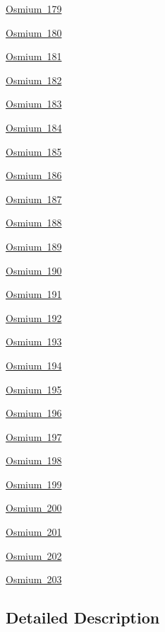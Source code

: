 \begin{DoxyCompactItemize}
\item 
\mbox{\hyperlink{group___isotope_const-_osmium-_os179}{Osmium 179}}
\item 
\mbox{\hyperlink{group___isotope_const-_osmium-_os180}{Osmium 180}}
\item 
\mbox{\hyperlink{group___isotope_const-_osmium-_os181}{Osmium 181}}
\item 
\mbox{\hyperlink{group___isotope_const-_osmium-_os182}{Osmium 182}}
\item 
\mbox{\hyperlink{group___isotope_const-_osmium-_os183}{Osmium 183}}
\item 
\mbox{\hyperlink{group___isotope_const-_osmium-_os184}{Osmium 184}}
\item 
\mbox{\hyperlink{group___isotope_const-_osmium-_os185}{Osmium 185}}
\item 
\mbox{\hyperlink{group___isotope_const-_osmium-_os186}{Osmium 186}}
\item 
\mbox{\hyperlink{group___isotope_const-_osmium-_os187}{Osmium 187}}
\item 
\mbox{\hyperlink{group___isotope_const-_osmium-_os188}{Osmium 188}}
\item 
\mbox{\hyperlink{group___isotope_const-_osmium-_os189}{Osmium 189}}
\item 
\mbox{\hyperlink{group___isotope_const-_osmium-_os190}{Osmium 190}}
\item 
\mbox{\hyperlink{group___isotope_const-_osmium-_os191}{Osmium 191}}
\item 
\mbox{\hyperlink{group___isotope_const-_osmium-_os192}{Osmium 192}}
\item 
\mbox{\hyperlink{group___isotope_const-_osmium-_os193}{Osmium 193}}
\item 
\mbox{\hyperlink{group___isotope_const-_osmium-_os194}{Osmium 194}}
\item 
\mbox{\hyperlink{group___isotope_const-_osmium-_os195}{Osmium 195}}
\item 
\mbox{\hyperlink{group___isotope_const-_osmium-_os196}{Osmium 196}}
\item 
\mbox{\hyperlink{group___isotope_const-_osmium-_os197}{Osmium 197}}
\item 
\mbox{\hyperlink{group___isotope_const-_osmium-_os198}{Osmium 198}}
\item 
\mbox{\hyperlink{group___isotope_const-_osmium-_os199}{Osmium 199}}
\item 
\mbox{\hyperlink{group___isotope_const-_osmium-_os200}{Osmium 200}}
\item 
\mbox{\hyperlink{group___isotope_const-_osmium-_os201}{Osmium 201}}
\item 
\mbox{\hyperlink{group___isotope_const-_osmium-_os202}{Osmium 202}}
\item 
\mbox{\hyperlink{group___isotope_const-_osmium-_os203}{Osmium 203}}
\end{DoxyCompactItemize}


\subsection{Detailed Description}

